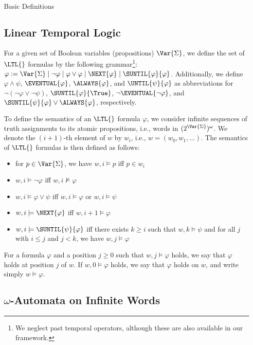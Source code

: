 \documentclass[copyright,creativecommons]{eptcs}
\begin{document}
\begin{section}{Basic Definitions}
\label{BasicDefinitions}
\subsection{Linear Temporal Logic}

For a given set of Boolean variables (propositions) $\Var{\Sigma}$, we define the set of $\LTL{}$ formulas by the following grammar\footnote{We neglect past temporal operators, although these are also available in our framework.}:
$\varphi := \Var{\Sigma}
	\mid \neg \varphi
	\mid \varphi \vee \varphi
	\mid \NEXT{\varphi}
	\mid \SUNTIL{\varphi}{\varphi}
$.
Additionally, we define $\varphi \wedge \psi$, $\EVENTUAL{\varphi}$, $\ALWAYS{\varphi}$, and $\UNTIL{\psi}{\varphi}$ as abbreviations for $\neg (\neg \varphi \vee \neg \psi)$, $\SUNTIL{\varphi}{\True}$, $\neg \EVENTUAL{\neg \varphi}$, and $\SUNTIL{\psi}{\varphi}\vee \ALWAYS{\varphi}$, respectively.

To define the semantics of an $\LTL{}$ formula $\varphi$, we consider infinite sequences of truth assignments to its atomic propositions, i.e., words in $(2^{\Var{\Sigma}})^\omega$. We denote the $(i+1)$-th element of $w$ by $w_i$, i.e., $w=(w_0,w_1,\ldots)$. The semantics of $\LTL{}$ formulas is then defined as follows:
\begin{itemize}
\item for $p \in \Var{\Sigma}$, we have $w,i \models p$ iff $p \in w_i$
\item $w,i \models \neg \varphi$ iff $w,i \not\models \varphi$
\item $w,i \models \varphi \vee \psi$ iff $w,i \models \varphi$ or $w,i\models \psi$
\item $w,i \models \NEXT{\varphi}$ iff $w,i+1 \models \varphi$
\item $w,i \models \SUNTIL{\psi}{\varphi}$ iff there exists $k\geq i$ such that $w,k \models \psi$ and for all $j$ with $i\leq j$ and $j<k$, we have $w,j \models \varphi$
\end{itemize}
For a formula $\varphi$ and a position $j\geq 0$ such that $w,j\models \varphi$ holds, we say that $\varphi$ holds at position $j$ of $w$. If $w,0 \models \varphi$ holds, we say that $\varphi$ holds on $w$, and write simply $w \models \varphi$.




\subsection{$\omega$-Automata on Infinite Words}


\end{section}
\end{document}
